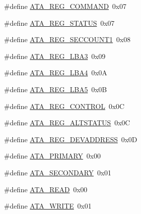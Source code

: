 \begin{DoxyCompactItemize}
\item 
\#define \hyperlink{a00023_a1a54069e05845badff84e1490ca4681e_a1a54069e05845badff84e1490ca4681e}{A\+T\+A\+\_\+\+R\+E\+G\+\_\+\+C\+O\+M\+M\+A\+ND}~0x07
\item 
\#define \hyperlink{a00023_a3b532ef33b38be16a240f8f2e21bc5db_a3b532ef33b38be16a240f8f2e21bc5db}{A\+T\+A\+\_\+\+R\+E\+G\+\_\+\+S\+T\+A\+T\+US}~0x07
\item 
\#define \hyperlink{a00023_a8a9a19e403cdc08cdb52ac4a77d44b1d_a8a9a19e403cdc08cdb52ac4a77d44b1d}{A\+T\+A\+\_\+\+R\+E\+G\+\_\+\+S\+E\+C\+C\+O\+U\+N\+T1}~0x08
\item 
\#define \hyperlink{a00023_af95cf3177ed01e63c3e2783f71e3bfb8_af95cf3177ed01e63c3e2783f71e3bfb8}{A\+T\+A\+\_\+\+R\+E\+G\+\_\+\+L\+B\+A3}~0x09
\item 
\#define \hyperlink{a00023_a39c9e21fd98a8933142af12c472ffb80_a39c9e21fd98a8933142af12c472ffb80}{A\+T\+A\+\_\+\+R\+E\+G\+\_\+\+L\+B\+A4}~0x0A
\item 
\#define \hyperlink{a00023_a24546e89863608bb2850a6ab39a24693_a24546e89863608bb2850a6ab39a24693}{A\+T\+A\+\_\+\+R\+E\+G\+\_\+\+L\+B\+A5}~0x0B
\item 
\#define \hyperlink{a00023_acd25672516342decdb4acb14b13dfa03_acd25672516342decdb4acb14b13dfa03}{A\+T\+A\+\_\+\+R\+E\+G\+\_\+\+C\+O\+N\+T\+R\+OL}~0x0C
\item 
\#define \hyperlink{a00023_a051769d4520d201d24bbb06758a5c1de_a051769d4520d201d24bbb06758a5c1de}{A\+T\+A\+\_\+\+R\+E\+G\+\_\+\+A\+L\+T\+S\+T\+A\+T\+US}~0x0C
\item 
\#define \hyperlink{a00023_adf8b096ca00ce8ce58af3dd79240b2e5_adf8b096ca00ce8ce58af3dd79240b2e5}{A\+T\+A\+\_\+\+R\+E\+G\+\_\+\+D\+E\+V\+A\+D\+D\+R\+E\+SS}~0x0D
\item 
\#define \hyperlink{a00023_aa18f254fa4afcfdb5fcf897eeaf38564_aa18f254fa4afcfdb5fcf897eeaf38564}{A\+T\+A\+\_\+\+P\+R\+I\+M\+A\+RY}~0x00
\item 
\#define \hyperlink{a00023_ad514d776b09e8b873aa7087ef0091fe6_ad514d776b09e8b873aa7087ef0091fe6}{A\+T\+A\+\_\+\+S\+E\+C\+O\+N\+D\+A\+RY}~0x01
\item 
\#define \hyperlink{a00023_a061cf4fd71859d6355aea5be3bae767a_a061cf4fd71859d6355aea5be3bae767a}{A\+T\+A\+\_\+\+R\+E\+AD}~0x00
\item 
\#define \hyperlink{a00023_a9a19b84aa7a02ac7e07528795816ffb2_a9a19b84aa7a02ac7e07528795816ffb2}{A\+T\+A\+\_\+\+W\+R\+I\+TE}~0x01
\end{DoxyCompactItemize}
